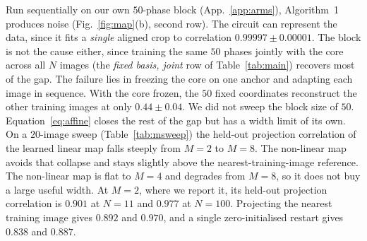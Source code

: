 \documentclass{article}
\begin{document}
Run sequentially on our own $50$-phase block (App.~\ref{app:arms}), Algorithm~1 produces noise
(Fig.~\ref{fig:map}(b), second row). The circuit can represent the data, since it fits a
\emph{single} aligned crop to correlation $0.99997 \pm 0.00001$. The block is not the cause either, since
training the same $50$ phases jointly with the core across all $N$ images (the \emph{fixed basis,
joint} row of Table~\ref{tab:main}) recovers most of the gap. The failure lies in freezing the core
on one anchor and adapting each image in sequence. With the core frozen, the $50$ fixed coordinates
reconstruct the other training images at only $0.44 \pm 0.04$. We did not sweep the block size of
$50$. Equation~\eqref{eq:affine} closes the rest of the gap but has a width limit of its own. On a
$20$-image sweep (Table~\ref{tab:msweep}) the held-out projection correlation of the learned linear
map falls steeply from $M{=}2$ to $M{=}8$. The non-linear map avoids that collapse and stays slightly
above the nearest-training-image reference. The non-linear
map is flat to $M{=}4$ and degrades from $M{=}8$, so it does not buy a large useful width. At
$M{=}2$, where we report it, its held-out projection correlation is $0.901$ at $N{=}11$ and $0.977$
at $N{=}100$. Projecting the nearest training image gives $0.892$ and $0.970$, and a single
zero-initialised restart gives $0.838$ and $0.887$.
\end{document}
